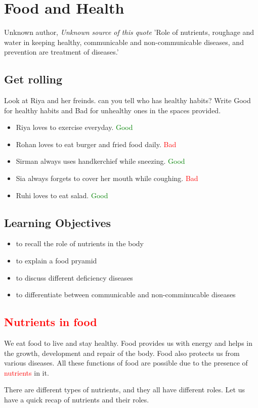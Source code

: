 \chapter{Food and Health}
\begin{chapquote}{Unknown author, \textit{Unknown source of this quote}}
'Role of nutrients, roughage and water in keeping healthy, communicable and non-communicable diseases, and prevention are treatment of diseases.'
\end{chapquote}

\section{Get rolling}
Look at Riya and her freinds. can you tell who has healthy habits? Write Good for healthy habits and Bad for unhealthy ones in the spaces provided.
\begin{itemize}
    \item Riya loves to exercise everyday. \textcolor{green}{Good}
    \item Rohan loves to eat burger and fried food daily. \textcolor{red}{Bad}
    \item Sirman always uses handkerchief while sneezing. \textcolor{green}{Good}
    \item Sia always forgets to cover her mouth while coughing. \textcolor{red}{Bad}
    \item Ruhi loves to eat salad. \textcolor{green}{Good}
\end{itemize}
\section{Learning Objectives}
\begin{itemize}
    \item to recall the role of nutrients in the body
    \item to explain a food pryamid
    \item to discuss different deficiency diseases 
    \item to differentiate between communicable and non-comminucable diseases
\end{itemize}
\section{\textcolor{red}{Nutrients in food}}
We eat food to live and stay healthy. Food provides us with energy and helps in the growth, development and repair of the body. Food also protects us from various diseases. All these functions of food are possible due to the presence of \textcolor{red}{nutrients} in it.\\
\par
There are different types of nutrients, and they all have different 
roles. Let us have a quick recap of nutrients and their roles.
